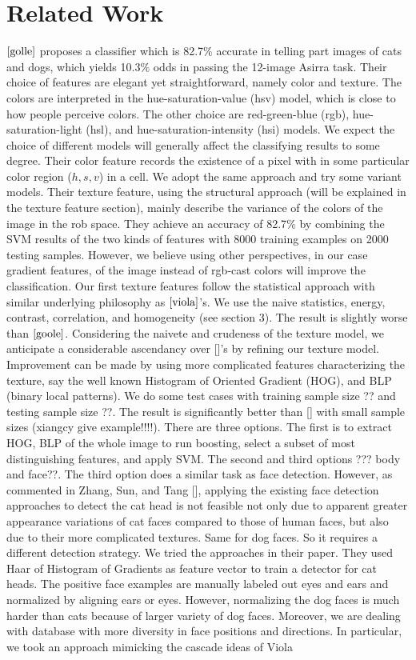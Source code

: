 \documentclass[12pt]{article}
\begin{document}
\section{Related Work}
$\cite{golle}$ proposes a classifier which is 82.7$\%$ accurate in telling part images of cats and dogs, which yields 10.3$\%$ odds in passing the 12-image Asirra task. Their choice of features are elegant yet straightforward, namely color and texture. The colors are interpreted in the hue-saturation-value (hsv) model, which is close to how people perceive colors. The other choice are red-green-blue (rgb), hue-saturation-light (hsl), and hue-saturation-intensity (hsi) models. We expect the choice of different models will generally affect the classifying results to some degree. Their color feature records the existence of a pixel with in some particular color region ($h,s,v$) in a cell. We adopt the same approach and try some variant models. Their texture feature, using the structural approach (will be explained in the texture feature section), mainly describe the variance of the colors of the image in the rob space. They achieve an accuracy of 82.7$\%$ by combining the SVM results of the two kinds of features with 8000 training examples on 2000 testing samples. However, we believe using other perspectives, in our case gradient features, of the image instead of rgb-cast colors will improve the classification. Our first texture features follow the statistical approach with similar underlying philosophy as $\cite{viola}$'s. We use the naive statistics, energy, contrast, correlation, and homogeneity (see section 3). The result is slightly worse than $\cite{goole}$. Considering the naivete and crudeness of the texture model, we anticipate a considerable ascendancy over []'s by refining our texture model. Improvement can be made by using more complicated features characterizing the texture, say the well known Histogram of Oriented Gradient (HOG), and BLP (binary local patterns). We do some test cases with training sample size ?? and testing sample size ??. The result is significantly better than [] with small sample sizes (xiangcy give example!!!!). There are three options. The first is to extract HOG, BLP of the whole image to run boosting, select a subset of most distinguishing features, and apply SVM. The second and third options ??? body and face??. The third option does a similar task as face detection. However, as commented in Zhang, Sun, and Tang [], applying the existing face detection approaches to detect the cat head is not feasible not only due to apparent greater appearance variations of cat faces compared to those of human faces, but also due to their more complicated textures. Same for dog faces. So it requires a different detection strategy. We tried the approaches in their paper. They used Haar of Histogram of Gradients as feature vector to train a detector for cat heads. The positive face examples are manually labeled out eyes and ears and normalized by aligning ears or eyes. However, normalizing the dog faces is much harder than cats because of larger variety of dog faces. Moreover, we are dealing with database with more diversity in face positions and directions. In particular, we took an approach mimicking the cascade ideas of Viola 
\end{document}
